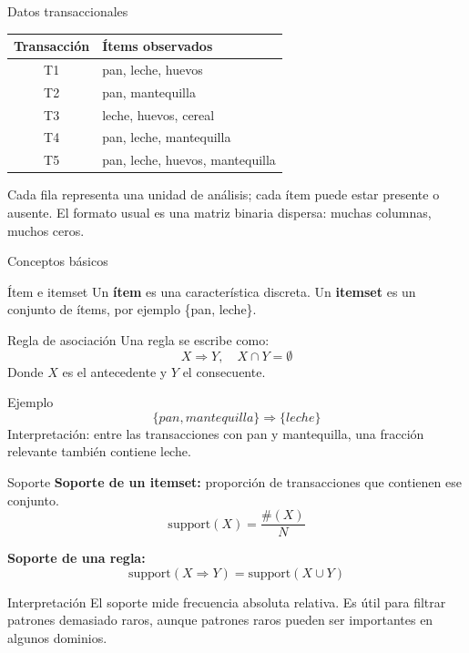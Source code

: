 \documentclass[10pt,aspectratio=169]{beamer}
\begin{document}
\begin{frame}{Datos transaccionales}
\begin{table}
\centering
\begin{tabular}{cl}
\toprule
Transacción & Ítems observados \\
\midrule
T1 & pan, leche, huevos \\
T2 & pan, mantequilla \\
T3 & leche, huevos, cereal \\
T4 & pan, leche, mantequilla \\
T5 & pan, leche, huevos, mantequilla \\
\bottomrule
\end{tabular}
\end{table}

\vspace{0.3cm}
Cada fila representa una unidad de análisis; cada ítem puede estar presente o ausente. El formato usual es una matriz binaria dispersa: muchas columnas, muchos ceros.
\end{frame}

\begin{frame}{Conceptos básicos}
\begin{block}{Ítem e itemset}
Un \textbf{ítem} es una característica discreta. Un \textbf{itemset} es un conjunto de ítems, por ejemplo \{pan, leche\}.
\end{block}

\begin{block}{Regla de asociación}
Una regla se escribe como:
\[
X \Rightarrow Y, \quad X \cap Y = \emptyset
\]
Donde $X$ es el antecedente y $Y$ el consecuente.
\end{block}

\begin{exampleblock}{Ejemplo}
\[
\{pan, mantequilla\} \Rightarrow \{leche\}
\]
Interpretación: entre las transacciones con pan y mantequilla, una fracción relevante también contiene leche.
\end{exampleblock}
\end{frame}

\begin{frame}{Soporte}
\textbf{Soporte de un itemset:} proporción de transacciones que contienen ese conjunto.
\[
\text{support}(X) = \frac{\#(X)}{N}
\]

\vspace{0.3cm}
\textbf{Soporte de una regla:}
\[
\text{support}(X \Rightarrow Y) = \text{support}(X \cup Y)
\]

\begin{block}{Interpretación}
El soporte mide frecuencia absoluta relativa. Es útil para filtrar patrones demasiado raros, aunque patrones raros pueden ser importantes en algunos dominios.
\end{block}
\end{frame}
\end{document}
